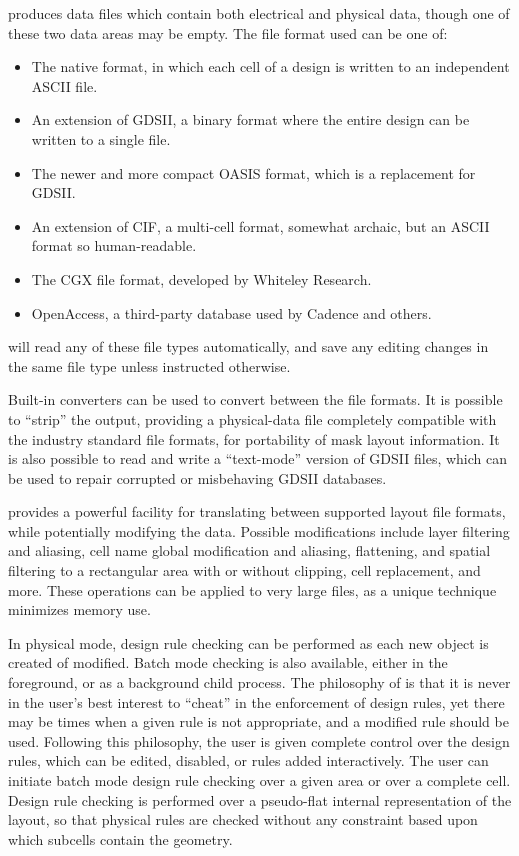 {\Xic} produces data files which contain both electrical and physical
data, though one of these two data areas may be empty.  The file
format used can be one of:
\begin{itemize}
\item{The native format, in which each cell of a design is written to
an independent ASCII file.}
\item{An extension of GDSII, a binary format where the entire design    
can be written to a single file.}
\item{The newer and more compact OASIS format, which is a replacement
for GDSII.}
\item{An extension of CIF, a multi-cell format, somewhat archaic,
but an ASCII format so human-readable.}
\item{The CGX file format, developed by Whiteley Research.}
\ifoa
\item{OpenAccess, a third-party database used by Cadence and others.}
\fi
\end{itemize}
{\Xic} will read any of these file types automatically, and save any
editing changes in the same file type unless instructed otherwise.

Built-in converters can be used to convert between the file formats. 
It is possible to ``strip'' the output, providing a
physical-data file completely compatible with the industry standard
file formats, for portability of mask layout information.  It is also
possible to read and write a ``text-mode'' version of GDSII files,
which can be used to repair corrupted or misbehaving GDSII databases.

{\Xic} provides a powerful facility for translating between supported
layout file formats, while potentially modifying the data.  Possible
modifications include layer filtering and aliasing, cell name global
modification and aliasing, flattening, and spatial filtering to a
rectangular area with or without clipping, cell replacement, and more. 
These operations can be applied to very large files, as a unique
technique minimizes memory use.

In physical mode, design rule checking can be performed as each new
object is created of modified.  Batch mode checking is also available,
either in the foreground, or as a background child process.  The
philosophy of {\Xic} is that it is never in the user's best interest
to ``cheat'' in the enforcement of design rules, yet there may be
times when a given rule is not appropriate, and a modified rule should
be used.  Following this philosophy, the user is given complete
control over the design rules, which can be edited, disabled, or rules
added interactively.  The user can initiate batch mode design rule
checking over a given area or over a complete cell.  Design rule
checking is performed over a pseudo-flat internal representation of
the layout, so that physical rules are checked without any constraint
based upon which subcells contain the geometry.

